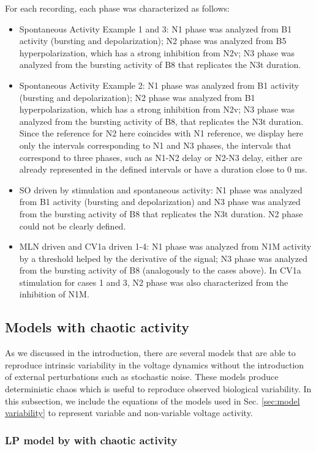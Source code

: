 For each recording, each phase was characterized as follows:
\begin{itemize}
    \item Spontaneous Activity Example 1 and 3: N1 phase was analyzed from B1 activity (bursting and depolarization); N2 phase was analyzed from B5 hyperpolarization, which has a strong inhibition from N2v; N3 phase was analyzed from the bursting activity of B8 that replicates the N3t duration. 
    \item Spontaneous Activity Example 2: N1 phase was analyzed from B1 activity (bursting and depolarization); N2 phase was analyzed from B1 hyperpolarization, which has a strong inhibition from N2v; N3 phase was analyzed from the bursting activity of B8, that replicates the N3t duration. Since the reference for N2 here coincides with N1 reference, we display here only the intervals corresponding to N1 and N3 phases, the intervals that correspond to three phases, such as N1-N2 delay or N2-N3 delay, either are already represented in the defined intervals or have a duration close to 0 ms.
    \item SO driven by stimulation and spontaneous activity: N1 phase was analyzed from B1 activity (bursting and depolarization) and N3 phase was analyzed from the bursting activity of B8 that replicates the N3t duration. N2 phase could not be clearly defined.
    \item MLN driven and CV1a driven 1-4: N1 phase was analyzed from N1M activity by a threshold helped by the derivative of the signal; N3 phase was analyzed from the bursting activity of B8 (analogously to the cases above). In CV1a stimulation for cases 1 and 3, N2 phase was also characterized from the inhibition of N1M. 
\end{itemize}

\subsection{Models with chaotic activity}
\label{sec:model variability equations}
As we discussed in the introduction, there are several models that are able to reproduce intrinsic variability in the voltage dynamics without the introduction of external perturbations such as stochastic noise. These models produce deterministic chaos which is useful to reproduce observed biological variability. In this subsection, we include the equations of the models used in Sec. \ref{sec:model variability} to represent variable and non-variable voltage activity.
\subsubsection{LP model by \textcite{nowotny_probing_2008} with chaotic activity}

